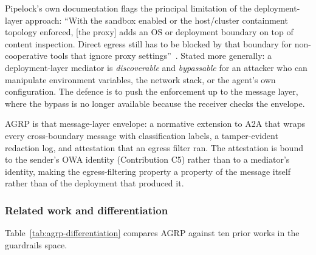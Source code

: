 Pipelock's own documentation flags the principal
limitation of the deployment-layer approach: ``With the
sandbox enabled or the host/cluster containment topology
enforced, [the proxy] adds an OS or deployment boundary
on top of content inspection. Direct egress still has to
be blocked by that boundary for non-cooperative tools
that ignore proxy settings''~\cite{pipelock}. Stated more
generally: a deployment-layer mediator is
\emph{discoverable} and \emph{bypassable} for an
attacker who can manipulate environment variables, the
network stack, or the agent's own configuration. The
defence is to push the enforcement up to the message
layer, where the bypass is no longer available because
the receiver checks the envelope.

AGRP is that message-layer envelope: a normative
extension to A2A that wraps every cross-boundary message
with classification labels, a tamper-evident redaction
log, and attestation that an egress filter ran. The
attestation is bound to the sender's OWA identity
(Contribution C5) rather than to a mediator's identity,
making the egress-filtering property a property of the
message itself rather than of the deployment that
produced it.

\subsubsection{Related work and differentiation}
\label{sec:proposals:agrp:related}

Table~\ref{tab:agrp-differentiation} compares AGRP
against ten prior works in the guardrails space.

